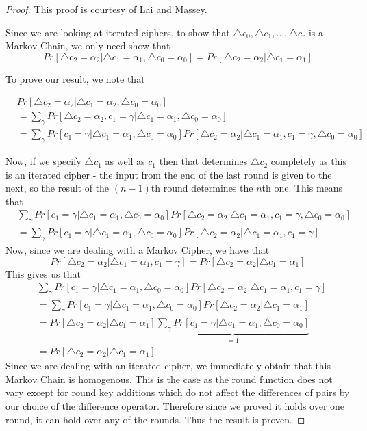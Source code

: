 \documentclass[12pt,a4paper]{article}
\begin{document}
\begin{proof}
This proof is courtesy of Lai and Massey\cite{MarkovCiphers}. 

Since we are looking at iterated ciphers, to show that $\triangle c_0, \triangle
c_1, \ldots, \triangle c_r$ is a Markov Chain, we only need show that 
\[Pr[\triangle c_2 = \alpha_2 | \triangle c_1 = \alpha_1, \triangle c_0 =
\alpha_0] = Pr[\triangle c_2 = \alpha_2 | \triangle c_1 = \alpha_1]\]

To prove our result, we note that 

\begin{align*}
&Pr[\triangle c_2 = \alpha_2 | \triangle c_1 = \alpha_2, \triangle c_0 =
\alpha_0] \\
&= \sum_\gamma Pr[\triangle c_2 = \alpha_2, c_1 = \gamma| \triangle c_1 =
\alpha_1, \triangle c_0 = \alpha_0]\\
&= \sum_\gamma Pr[c_1 = \gamma| \triangle c_1 = \alpha_1, \triangle c_0 =
\alpha_0] Pr[\triangle c_2 = \alpha_2|\triangle c_1 = \alpha_1, c_1=\gamma, \triangle c_0 =
\alpha_0]
\end{align*}

Now, if we specify $\triangle c_1$ as well as $c_1$ then that determines
$\triangle c_2$ completely as this is an iterated cipher - the input from the
end of the last round is given to the next, so the result of the $(n-1)$th
round determines the $n$th one. This means that
\begin{align*}
&\sum_\gamma Pr[c_1 = \gamma| \triangle c_1 = \alpha_1, \triangle c_0 =
\alpha_0] Pr[\triangle c_2 = \alpha_2|\triangle c_1 = \alpha_1, c_1=\gamma, \triangle c_0 =
\alpha_0]\\
&= \sum_\gamma Pr[c_1 = \gamma| \triangle c_1 = \alpha_1, \triangle c_0 =
\alpha_0] Pr[\triangle c_2 = \alpha_2|\triangle c_1 = \alpha_1, c_1=\gamma]
\end{align*}
Now, since we are dealing with a Markov Cipher, we have that 
\[Pr[\triangle c_2 = \alpha_2| \triangle c_1 = \alpha_1, c_1 = \gamma] =
Pr[\triangle c_2 = \alpha_2| \triangle c_1 = \alpha_1] \]
This gives us that
\begin{align*}
&\sum_\gamma Pr[c_1 = \gamma| \triangle c_1 = \alpha_1, \triangle c_0 =
\alpha_0] Pr[\triangle c_2 = \alpha_2|\triangle c_1 = \alpha_1, c_1=\gamma] \\
&= \sum_\gamma Pr[c_1 = \gamma| \triangle c_1 = \alpha_1, \triangle c_0 =
\alpha_0] Pr[\triangle c_2 = \alpha_2|\triangle c_1 = \alpha_1]\\
&= Pr[\triangle c_2 = \alpha_2|\triangle c_1 = \alpha_1]
\underbrace{\sum_\gamma Pr[c_1 = \gamma| \triangle c_1 = \alpha_1, \triangle
c_0 = \alpha_0]}_{=1} \\
&=Pr[\triangle c_2 = \alpha_2 | \triangle c_1 = \alpha_1]
\end{align*}
Since we are dealing with an iterated cipher, we immediately obtain that this
Markov Chain is homogenous. This is the case as the round function does not
vary except for round key additions which do not affect the differences of
pairs by our choice of the difference operator. Therefore since we proved it
holds over one round, it can hold over any of the rounds. Thus the result is
proven.
\end{proof}
\end{document}
